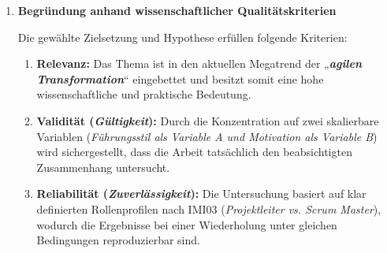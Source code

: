 \begin{enumerate}[label=\thechapter.\arabic*), leftmargin=*]
\begin{itemize}
    \end{itemize}
    \item \textbf{Begründung anhand wissenschaftlicher Qualitätskriterien} \par Die gewählte Zielsetzung und Hypothese erfüllen folgende Kriterien:
    \begin{enumerate}[label=\thechapter.\arabic{enumi}.\arabic*), leftmargin=*]
        \item \textbf{Relevanz:} Das Thema ist in den aktuellen Megatrend der „\textbf{\textit{agilen Transformation}}“ eingebettet und besitzt somit eine hohe wissenschaftliche und praktische Bedeutung.
        \item \textbf{Validität (\textit{Gültigkeit}):} Durch die Konzentration auf zwei skalierbare Variablen (\textit{Führungsstil als Variable A und Motivation als Variable B}) wird sichergestellt, dass die Arbeit tatsächlich den beabsichtigten Zusammenhang untersucht.
        \item \textbf{Reliabilität (\textit{Zuverlässigkeit}):} Die Untersuchung basiert auf klar definierten Rollenprofilen nach IMI03 (\textit{Projektleiter \acs{vs.} Scrum Master}), wodurch die Ergebnisse bei einer Wiederholung unter gleichen Bedingungen reproduzierbar sind.
    \end{enumerate}
\end{enumerate}

